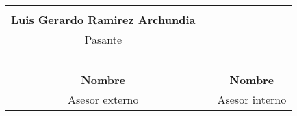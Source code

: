 \documentclass[12pt]{article}
\begin{document}
\vspace{40mm}
\begin{table}[h!]
    \begin{tabular}{clc}
    \hrulefill           & \multicolumn{1}{c}{} &                      \\
    \scriptsize{\textbf{Luis Gerardo Ramirez Archundia}}        & \multicolumn{1}{c}{} &                                                     \\
    \scriptsize{Pasante} & \multicolumn{1}{c}{} &                      \\
    \multicolumn{1}{l}{} &                      & \multicolumn{1}{l}{} \\
    \multicolumn{1}{l}{} &                      & \multicolumn{1}{l}{} \\
    \multicolumn{1}{l}{} &                      & \multicolumn{1}{l}{} \\
    \multicolumn{1}{l}{} &                      & \multicolumn{1}{l}{} \\
    \hrulefill           &                      & \hrulefill           \\
    \scriptsize{\textbf{Nombre}} &                      & \scriptsize{\textbf{Nombre}} \\
    \scriptsize{Asesor externo}                                 &                      & \scriptsize{Asesor interno}                        
    \end{tabular}
    \end{table}
\end{document}
